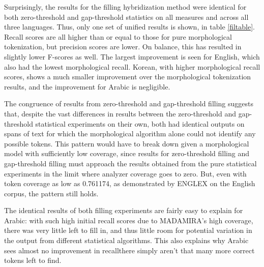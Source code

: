 
Surprisingly, the results for the filling hybridization method were identical for both zero-threshold and gap-threshold statistics on all measures and across all three languages. Thus, only one set of unified results is shown, in table \ref{filtable}. Recall scores are all higher than or equal to those for pure morphological tokenization, but precision scores are lower. On balance, this has resulted in slightly lower F-scores as well. The largest improvement is seen for English, which also had the lowest morphological recall. Korean, with higher morphological recall scores, shows a much smaller improvement over the morphological tokenization results, and the improvement for Arabic is negligible.

The congruence of results from zero-threshold and gap-threshold filling suggests that, despite the vast differences in results between the zero-threshold and gap-threshold statistical experiments on their own, both had identical outputs on spans of text for which the morphological algorithm alone could not identify any possible tokens. This pattern would have to break down given a morphological model with sufficiently low coverage, since results for zero-threshold filling and gap-threshold filling must approach the results obtained from the pure statistical experiments in the limit where analyzer coverage goes to zero. But, even with token coverage as low as 0.761174, as demonstrated by ENGLEX on the English corpus, the pattern still holds.

The identical results of both filling experiments are fairly easy to explain for Arabic: with such high initial recall scores due to MADAMIRA's high coverage, there was very little left to fill in, and thus little room for potential variation in the output from different statistical algorithms. This also explains why Arabic sees almost no improvement in recall\textemdash there simply aren't that many more correct tokens left to find. 

